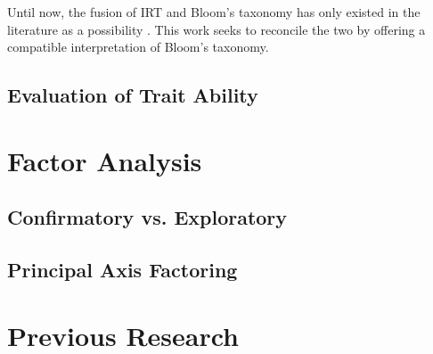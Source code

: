 Until now, the fusion of IRT and Bloom's taxonomy has only existed in the
literature as a possibility \cite{sitthisak}.  This work seeks to reconcile
the two by offering a compatible interpretation of Bloom's taxonomy.

\subsection{Evaluation of Trait Ability}

\section{Factor Analysis}

\subsection{Confirmatory vs. Exploratory}
\subsection{Principal Axis Factoring}

\section{Previous Research}

